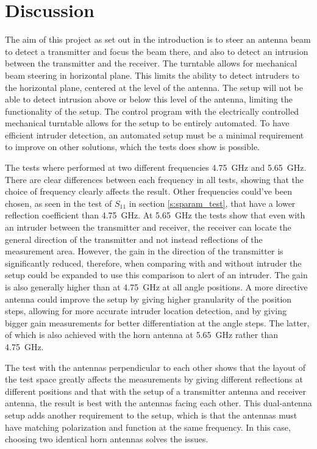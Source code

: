 \chapter{Discussion}
The aim of this project as set out in the introduction is to steer an antenna beam to detect a transmitter and focus the beam there, and also to detect an intrusion between the transmitter and the receiver. The turntable allows for mechanical beam steering in horizontal plane. This limits the ability to detect intruders to the horizontal plane, centered at the level of the antenna. The setup will not be able to detect intrusion above or below this level of the antenna, limiting the functionality of the setup. The control program with the electrically controlled mechanical turntable allows for the setup to be entirely automated. To have efficient intruder detection, an automated setup must be a minimal requirement to improve on other solutions, which the tests does show is possible.

The tests where performed at two different frequencies \SI{4.75}{\giga\hertz} and \SI{5.65}{\giga\hertz}. There are clear differences between each frequency in all tests, showing that the choice of frequency clearly affects the result. Other frequencies could've been chosen, as seen in the test of $S_{11}$ in section \ref{s:sparam_test}, that have a lower reflection coefficient than \SI{4.75}{\giga\hertz}. At \SI{5.65}{\giga\hertz} the tests show that even with an intruder between the transmitter and receiver, the receiver can locate the general direction of the transmitter and not instead reflections of the measurement area. However, the gain in the direction of the transmitter is significantly reduced, therefore, when comparing with and without intruder the setup could be expanded to use this comparison to alert of an intruder. The gain is also generally higher than at \SI{4.75}{\giga\hertz} at all angle positions. A more directive antenna could improve the setup by giving higher granularity of the position steps, allowing for more accurate intruder location detection, and by giving bigger gain measurements for better differentiation at the angle steps. The latter, of which is also achieved with the horn antenna at \SI{5.65}{\giga\hertz} rather than \SI{4.75}{\giga\hertz}.

The test with the antennas perpendicular to each other shows that the layout of the test space greatly affects the measurements by giving different reflections at different positions and that with the setup of a transmitter antenna and receiver antenna, the result is best with the antennas facing each other. This dual-antenna setup adds another requirement to the setup, which is that the antennas must have matching polarization and function at the same frequency. In this case, choosing two identical horn antennas solves the issues. 

